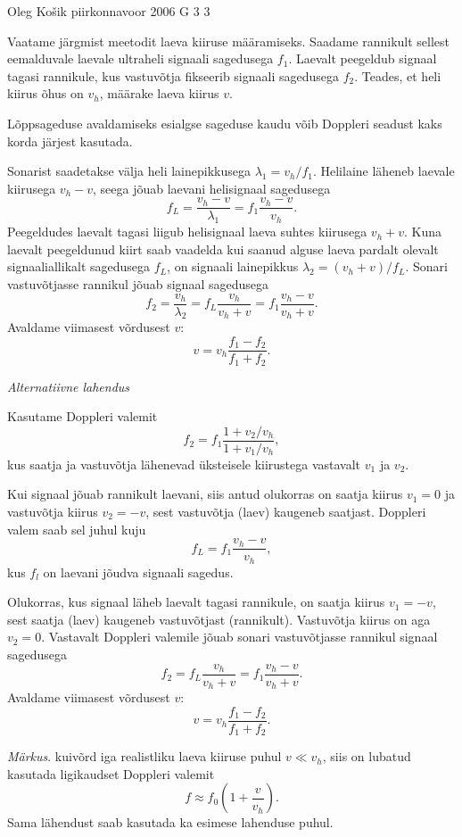 {Oleg Košik} %
{piirkonnavoor} %
{2006} %
{G 3} %
{3} %
{
\ifStatement
Vaatame järgmist meetodit laeva kiiruse määramiseks. Saadame rannikult sellest eemalduvale laevale ultraheli signaali sagedusega $f_1$. Laevalt peegeldub signaal tagasi rannikule, kus vastuvõtja fikseerib signaali sagedusega $f_2$. Teades, et heli kiirus õhus on $v_h$, määrake laeva kiirus $v$.
\fi


\ifHint
Lõppsageduse avaldamiseks esialgse sageduse kaudu võib Doppleri seadust kaks korda järjest kasutada.
\fi


\ifSolution
Sonarist saadetakse välja heli lainepikkusega $\lambda_1 = v_h/f_1$. Helilaine läheneb laevale kiirusega $v_h - v$, seega jõuab laevani helisignaal sagedusega
\[
f_L = \frac{v_h-v}{\lambda_1} = f_1 \frac{v_h-v}{v_h}.
\]
Peegeldudes laevalt tagasi liigub helisignaal laeva suhtes kiirusega $v_h + v$. Kuna laevalt peegeldunud kiirt saab vaadelda kui saanud alguse laeva pardalt olevalt signaaliallikalt sagedusega $f_L$, on signaali lainepikkus $\lambda_2 = (v_h+v)/f_L$. Sonari vastuvõtjasse rannikul jõuab signaal sagedusega
\[
f_{2}=\frac{v_{h}}{\lambda_{2}}=f_{L} \frac{v_{h}}{v_{h}+v}=f_{1} \frac{v_{h}-v}{v_{h}+v}.
\]
Avaldame viimasest võrdusest $v$:
\[
v = v_h \frac{f_1-f_2}{f_1+f_2}.
\]

\vspace{0.5\baselineskip}

\emph{Alternatiivne lahendus}

Kasutame Doppleri valemit
\[
f_2 = f_1 \frac{1+v_2/v_h}{1+v_1/v_h},
\]
kus saatja ja vastuvõtja lähenevad üksteisele kiirustega vastavalt $v_1$ ja $v_2$.

Kui signaal jõuab rannikult laevani, siis antud olukorras on saatja kiirus $v_1 = 0$ ja vastuvõtja kiirus $v_2 = -v$, sest vastuvõtja (laev) kaugeneb saatjast. Doppleri valem saab sel juhul kuju
\[
f_L = f_1 \frac{v_h-v}{v_h}, 
\]
kus $f_l$ on laevani jõudva signaali sagedus.

Olukorras, kus signaal läheb laevalt tagasi rannikule, on saatja kiirus $v_1 = -v$, sest saatja (laev) kaugeneb vastuvõtjast (rannikult). Vastuvõtja kiirus on aga $v_2 = 0$. Vastavalt Doppleri valemile jõuab sonari vastuvõtjasse rannikul signaal sagedusega
\[
f_2 = f_L \frac{v_h}{v_h+v} = f_1 \frac{v_h-v}{v_h+v}. 
\]
Avaldame viimasest võrdusest $v$:
\[
v = v_h \frac{f_1-f_2}{f_1+f_2}. 
\]

\emph{Märkus}. kuivõrd iga realistliku laeva kiiruse puhul $v \ll v_h$, siis on lubatud
kasutada ligikaudset Doppleri valemit
\[
f \approx f_0 \left(1+\frac{v}{v_h}\right).
\]
Sama lähendust saab kasutada ka esimese lahenduse puhul.
\fi
}